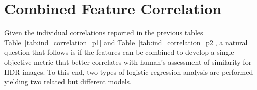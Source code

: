 \section{Combined Feature Correlation}

Given the individual correlations reported in the previous tables Table~\ref{tab:ind_correlation_p1} and Table~\ref{tab:ind_correlation_p2}, a natural question that follows is if the features can be combined to develop a single objective metric that better correlates with human’s assessment of similarity for HDR images. To this end, two types of logistic regression analysis are performed yielding two related but different models.




